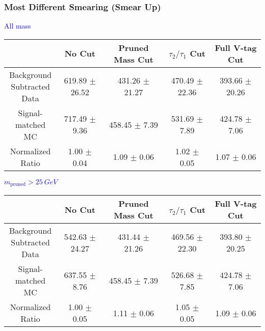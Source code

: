 \documentclass{beamer}
\begin{document}
\begin{frame}
  \frametitle{Most Different Smearing (Smear Up)}
  \begin{adjustwidth}{-1.5em}{-1.5em}
    \centering
    \vspace{6pt}
    \textcolor{blue}{All mass}
    \vspace{6pt}

    {\scriptsize
      \begin{tabular}{c | c | c | c | c}
        \hline
        & No Cut & Pruned Mass Cut & $\tau_2/\tau_1$ Cut & Full V-tag Cut \\
        \hline
        \makecell{Background \\ Subtracted \\ Data} & 619.89 $\pm$ 26.52 & 431.26 $\pm$ 21.27 & 470.49 $\pm$ 22.36 & 393.66 $\pm$ 20.26 \\
        \makecell{Signal-\\ matched MC} & 717.49 $\pm$ 9.36 & 458.45 $\pm$ 7.39 & 531.69 $\pm$ 7.89 & 424.78 $\pm$ 7.06 \\
        \hline
        \makecell{Normalized \\ Ratio} & 1.00 $\pm$ 0.04 & 1.09 $\pm$ 0.06 & 1.02 $\pm$ 0.05 & 1.07 $\pm$ 0.06 \\
        \hline
      \end{tabular}
    }
    
    \vspace{6pt}
    \textcolor{blue}{$m_\text{pruned} > \SI{25}{GeV}$}
    \vspace{6pt}

    {\scriptsize
      \begin{tabular}{c | c | c | c | c}
        \hline
        & No Cut & Pruned Mass Cut & $\tau_2/\tau_1$ Cut & Full V-tag Cut \\
        \hline
        \makecell{Background \\ Subtracted \\ Data} & 542.63 $\pm$ 24.27 & 431.44 $\pm$ 21.26 & 469.56 $\pm$ 22.30 & 393.80 $\pm$ 20.25 \\
        \makecell{Signal-\\ matched MC} & 637.55 $\pm$ 8.76 & 458.45 $\pm$ 7.39 & 526.68 $\pm$ 7.85 & 424.78 $\pm$ 7.06 \\
        \hline
        \makecell{Normalized \\ Ratio} & 1.00 $\pm$ 0.05 & 1.11 $\pm$ 0.06 & 1.05 $\pm$ 0.05 & 1.09 $\pm$ 0.06 \\
        \hline
      \end{tabular}
    }
  \end{adjustwidth}
\end{frame}
\end{document}
